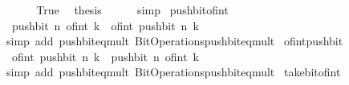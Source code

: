 \begin{isabellebody}
\ \ \isamarkupfalse%
\isanewline
\ \ \isamarkupfalse%
\ True\ \isamarkupfalse%
\ {\isacharquery}{\kern0pt}thesis\isanewline
\ \ \ \ \isamarkupfalse%
\ simp\isanewline
{}\isamarkupfalse%
%
\endisatagproof
{\isafoldproof}%
%
\isadelimproof
\isanewline
%
\endisadelimproof
\isanewline
{}\isamarkupfalse%
\ push{\isacharunderscore}{\kern0pt}bit{\isacharunderscore}{\kern0pt}of{\isacharunderscore}{\kern0pt}int{\isacharcolon}{\kern0pt}\isanewline
\ \ {\isacartoucheopen}push{\isacharunderscore}{\kern0pt}bit\ n\ {\isacharparenleft}{\kern0pt}of{\isacharunderscore}{\kern0pt}int\ k{\isacharparenright}{\kern0pt}\ {\isacharequal}{\kern0pt}\ of{\isacharunderscore}{\kern0pt}int\ {\isacharparenleft}{\kern0pt}push{\isacharunderscore}{\kern0pt}bit\ n\ k{\isacharparenright}{\kern0pt}{\isacartoucheclose}\isanewline
%
\isadelimproof
\ \ %
\endisadelimproof
%
\isatagproof
{}\isamarkupfalse%
\ {\isacharparenleft}{\kern0pt}simp\ add{\isacharcolon}{\kern0pt}\ push{\isacharunderscore}{\kern0pt}bit{\isacharunderscore}{\kern0pt}eq{\isacharunderscore}{\kern0pt}mult\ Bit{\isacharunderscore}{\kern0pt}Operations{\isachardot}{\kern0pt}push{\isacharunderscore}{\kern0pt}bit{\isacharunderscore}{\kern0pt}eq{\isacharunderscore}{\kern0pt}mult{\isacharparenright}{\kern0pt}%
\endisatagproof
{\isafoldproof}%
%
\isadelimproof
\isanewline
%
\endisadelimproof
\isanewline
{}\isamarkupfalse%
\ of{\isacharunderscore}{\kern0pt}int{\isacharunderscore}{\kern0pt}push{\isacharunderscore}{\kern0pt}bit{\isacharcolon}{\kern0pt}\isanewline
\ \ {\isacartoucheopen}of{\isacharunderscore}{\kern0pt}int\ {\isacharparenleft}{\kern0pt}push{\isacharunderscore}{\kern0pt}bit\ n\ k{\isacharparenright}{\kern0pt}\ {\isacharequal}{\kern0pt}\ push{\isacharunderscore}{\kern0pt}bit\ n\ {\isacharparenleft}{\kern0pt}of{\isacharunderscore}{\kern0pt}int\ k{\isacharparenright}{\kern0pt}{\isacartoucheclose}\isanewline
%
\isadelimproof
\ \ %
\endisadelimproof
%
\isatagproof
{}\isamarkupfalse%
\ {\isacharparenleft}{\kern0pt}simp\ add{\isacharcolon}{\kern0pt}\ push{\isacharunderscore}{\kern0pt}bit{\isacharunderscore}{\kern0pt}eq{\isacharunderscore}{\kern0pt}mult\ Bit{\isacharunderscore}{\kern0pt}Operations{\isachardot}{\kern0pt}push{\isacharunderscore}{\kern0pt}bit{\isacharunderscore}{\kern0pt}eq{\isacharunderscore}{\kern0pt}mult{\isacharparenright}{\kern0pt}%
\endisatagproof
{\isafoldproof}%
%
\isadelimproof
\isanewline
%
\endisadelimproof
\isanewline
{}\isamarkupfalse%
\ take{\isacharunderscore}{\kern0pt}bit{\isacharunderscore}{\kern0pt}of{\isacharunderscore}{\kern0pt}int{\isacharcolon}{\kern0pt}\isanewline

\end{isabellebody}
